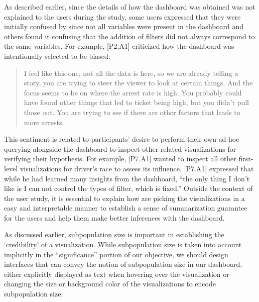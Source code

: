 \par As described earlier, since the details of how the dashboard was obtained was not explained to the users during the study, some users expressed that they were initially confused by \system since not all variables were present in the dashboard and others found it confusing that the addition of filters did not always correspond to the same variables. For example, [P2.A1] criticized how the dashboard was intentionally selected to be biased:
\begin{quote}
I feel like this one, not all the data is here, so we are already telling a story, you are trying to steer the viewer to look at certain things. And the focus seems to be on where the arrest rate is high. You probably could have found other things that led to ticket being high, but you didn't pull those out. You are trying to see if there are other factors that leads to more arrests.
\end{quote}
\npar This sentiment is related to participants' desire to perform their own ad-hoc querying alongside the dashboard to inspect other related visualizations for verifying their hypothesis. For example, [P7.A1] wanted to inspect all other first-level visualizations for driver's race to assess its influence. [P7.A1] expressed that while he had learned many insights from the dashboard, ``the only thing I don't like is I can not control the types of filter, which is fixed.'' Outside the context of the user study, it is essential to explain how \system are picking the visualizations in a easy and interpretable manner to establish a sense of summarization guarantee for the users and help them make better inferences with the dashboard.
\par As discussed earlier, subpopulation size is important in establishing the `credibility' of a visualization. While subpopulation size is taken into account implicitly in the ``significance'' portion of our objective, we should design interfaces that can convey the notion of subpopulation size in our dashboard, either explicitly displayed as text when hovering over the visualization or changing the size or background color of the visualizations to encode subpopulation size.




